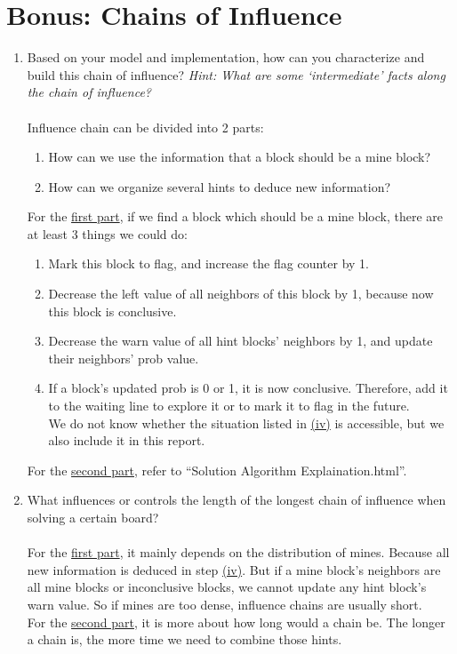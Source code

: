 \documentclass[letter]{article}
\begin{document}
\section{Bonus: Chains of Influence}
\begin{enumerate}
	\item {Based on your model and implementation, how can you characterize and build this chain of influence? \textit{Hint: What are some `intermediate' facts along the chain of influence?}} \\
	\\
	Influence chain can be divided into 2 parts:
	\begin{enumerate}
		\label{firstpart}
		\item {How can we use the information that a block should be a mine block?}
		\label{secondpart}
		\item {How can we organize several hints to deduce new information?}
	\end{enumerate}
	
	For the \hyperref[firstpart]{first part}, if we find a block which should be a mine block, there are at least 3 things we could do:
	\begin{enumerate}[label=(\roman*)]
		\item {Mark this block to flag, and increase the flag counter by 1.}
		\item {Decrease the left value of all neighbors of this block by 1, because now this block is conclusive.}
		\item {Decrease the warn value of all hint blocks’ neighbors by 1, and update their neighbors’ prob value.} 
		\label{step-d}
		\item {If a block’s updated prob is 0 or 1, it is now conclusive. Therefore, add it to the waiting line to explore it or to mark it to flag in the future.} \\
		We do not know whether the situation listed in \hyperref[step-d]{(iv)} is accessible, but we also include it in this report.
	\end{enumerate}
	
	For the \hyperref[secondpart]{second part}, refer to “Solution Algorithm Explaination.html”.
	
	\item {What influences or controls the length of the longest chain of influence when solving a certain board?} \\
	\\
	For the \hyperref[firstpart]{first part}, it mainly depends on the distribution of mines. Because all new information is deduced in step \hyperref[step-d]{(iv)}. But if a mine block’s neighbors are all mine blocks or inconclusive blocks, we cannot update any hint block’s warn value. So if mines are too dense, influence chains are usually short. \\
	For the \hyperref[secondpart]{second part}, it is more about how long would a chain be. The longer a chain is, the more time we need to combine those hints. \\
	

\end{enumerate}
\end{document}
